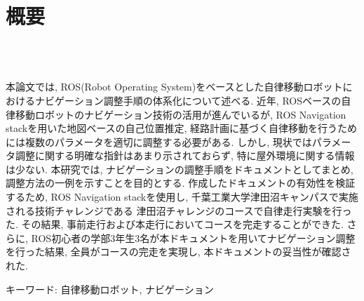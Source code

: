 \chapter*{概要}
\thispagestyle{empty}
%
\begin{center}
  \scalebox{1.5}{ROSベースの自律移動ロボットにおける}\\
  \scalebox{1.5}{ナビゲーション調整手順の体系化}\\
\end{center}
\vspace{1.0zh}
%

本論文では, ROS(Robot Operating System)をベースとした自律移動ロボットにおけるナビゲーション調整手順の体系化について述べる. 
近年, ROSベースの自律移動ロボットのナビゲーション技術の活用が進んでいるが, ROS Navigation stackを用いた地図ベースの自己位置推定, 経路計画に基づく自律移動を行うためには複数のパラメータを適切に調整する必要がある. 
しかし, 現状ではパラメータ調整に関する明確な指針はあまり示されておらず, 特に屋外環境に関する情報は少ない. 
本研究では, ナビゲーションの調整手順をドキュメントとしてまとめ, 調整方法の一例を示すことを目的とする. 
作成したドキュメントの有効性を検証するため, ROS Navigation stackを使用し, 千葉工業大学津田沼キャンパスで実施される技術チャレンジである
津田沼チャレンジのコースで自律走行実験を行った. その結果, 事前走行および本走行においてコースを完走することができた. 
さらに, ROS初心者の学部3年生3名が本ドキュメントを用いてナビゲーション調整を行った結果, 全員がコースの完走を実現し, 本ドキュメントの妥当性が確認された. 

\vspace{1.0zh}

キーワード: 自律移動ロボット, ナビゲーション
%
\newpage
